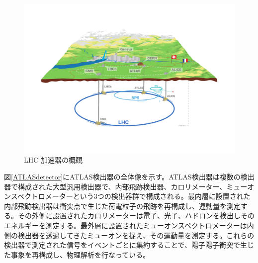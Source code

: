 \begin{figure} 
\centering
\includegraphics[width=16cm]{fig/Intro/LHCoverview.pdf}
\caption[LHC 加速器の概観]{LHC 加速器の概観\cite{cern_general_photo}}
\label{LHCoverview}
\end{figure}

図\ref{ATLASdetector}にATLAS検出器の全体像を示す。ATLAS検出器は複数の検出器で構成された大型汎用検出器で、内部飛跡検出器、カロリメーター、ミューオンスペクトロメーターという3つの検出器群で構成される。最内層に設置された内部飛跡検出器は衝突点で生じた荷電粒子の飛跡を再構成し、運動量を測定する。その外側に設置されたカロリメーターは電子、光子、ハドロンを検出しそのエネルギーを測定する。最外層に設置されたミューオンスペクトロメーターは内側の検出器を透過してきたミューオンを捉え、その運動量を測定する。これらの検出器で測定された信号をイベントごとに集約することで、陽子陽子衝突で生じた事象を再構成し、物理解析を行なっている。

